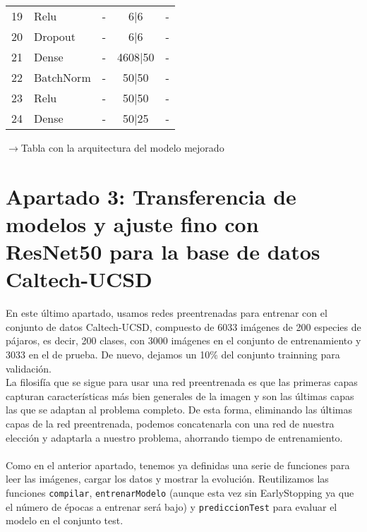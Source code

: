 \documentclass[12pt]{article}
\begin{document}
\begin{table}[H]
\begin{tabular}{lllcc}
19                 & Relu                 & -                    & 6|6                                                                         & -                                                                          \\
20                 & Dropout              & -                    & 6|6                                                                         & -                                                                          \\
21                 & Dense                & -                    & 4608|50                                                                     & -                                                                          \\
22                 & BatchNorm            & -                    & 50|50                                                                       & -                                                                          \\
23                 & Relu                 & -                    & 50|50                                                                       & -                                                                          \\
24                 & Dense                & -                    & 50|25                                                                       & -                                                                         
\end{tabular}
\end{table}
$\rightarrow$Tabla con la arquitectura del modelo mejorado\\
\newpage
\section*{Apartado 3: Transferencia de modelos y ajuste fino con ResNet50 para la base de datos
Caltech-UCSD}
En este último apartado, usamos redes preentrenadas para entrenar con el conjunto de datos Caltech-UCSD, compuesto de 6033 imágenes de 200 especies de pájaros, es decir, 200 clases, con 3000 imágenes en el conjunto de entrenamiento y 3033 en el de prueba. De nuevo, dejamos un 10$\%$ del conjunto trainning para validación.\\
La filosifía que se sigue para usar una red preentrenada es que las primeras capas capturan características más bien generales de la imagen y son las últimas capas las que se adaptan al problema completo. De esta forma, eliminando las últimas capas de la red preentrenada, podemos concatenarla con una red de nuestra elección y adaptarla a nuestro problema, ahorrando tiempo de entrenamiento.\\\\
Como en el anterior apartado, tenemos ya definidas una serie de funciones para leer las imágenes, cargar los datos y mostrar la evolución. Reutilizamos las funciones \texttt{compilar}, \texttt{entrenarModelo} (aunque esta vez sin EarlyStopping ya que el número de épocas a entrenar será bajo) y \texttt{prediccionTest} para evaluar el modelo en el conjunto test.
\end{document}
